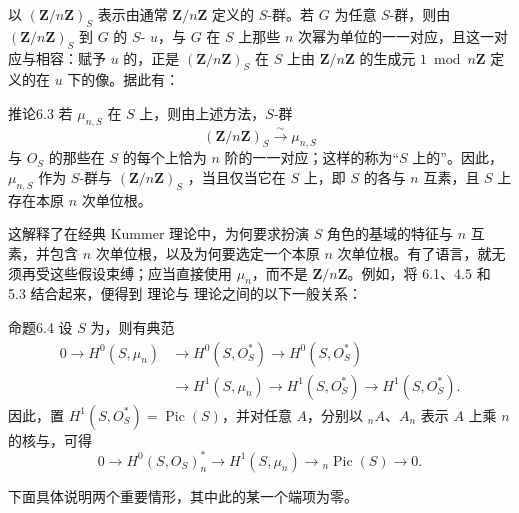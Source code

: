 以 $(\mathbf Z/n\mathbf Z)_S$ 表示由通常 $\mathbf Z/n\mathbf Z$ 定义的 $S$-群。若 $G$ 为任意 $S$-群，则由 $(\mathbf Z/n\mathbf Z)_S$ 到 $G$ 的 $S$- $u$，与 $G$ 在 $S$ 上那些 $n$ 次幂为单位的一一对应，且这一对应与相容：赋予 $u$ 的，正是 $(\mathbf Z/n\mathbf Z)_S$ 在 $S$ 上由 $\mathbf Z/n\mathbf Z$ 的生成元 $1\bmod n\mathbf Z$ 定义的在 $u$ 下的像。据此有：

\begin{SGAresult}{推论}{6.3}
若 $\mu_{n,S}$ 在 $S$ 上，则由上述方法，$S$-群
\[
(\mathbf Z/n\mathbf Z)_S\xrightarrow{\sim}\mu_{n,S}
\]
与 $O_S$ 的那些在 $S$ 的每个上恰为 $n$ 阶的一一对应；这样的称为“$S$ 上的”。因此，$\mu_{n,S}$ 作为 $S$-群与 $(\mathbf Z/n\mathbf Z)_S$ ，当且仅当它在 $S$ 上，即 $S$ 的各与 $n$ 互素，且 $S$ 上存在本原 $n$ 次单位根。
\end{SGAresult}
这解释了在经典 Kummer 理论中，为何要求扮演 $S$ 角色的基域的特征与 $n$ 互素，并包含 $n$ 次单位根，以及为何要选定一个本原 $n$ 次单位根。有了语言，就无须再受这些假设束缚；应当直接使用 $\mu_n$，而不是 $\mathbf Z/n\mathbf Z$。例如，将 6.1、4.5 和 5.3 结合起来，便得到 理论与 理论之间的以下一般关系：

\begin{SGAresult}{命题}{6.4}
设 $S$ 为，则有典范
\[
\begin{aligned}
0\longrightarrow H^0(S,\mu_n)&\longrightarrow H^0(S,O_S^*)
\longrightarrow H^0(S,O_S^*)\\
&\longrightarrow H^1(S,\mu_n)\longrightarrow H^1(S,O_S^*)
\longrightarrow H^1(S,O_S^*).
\end{aligned}
\]
因此，置 $H^1(S,O_S^*)=\operatorname{Pic}(S)$，并对任意 $A$，分别以 $ {}_nA$、$A_n$ 表示 $A$ 上乘 $n$ 的核与，可得
\[
0\longrightarrow H^0(S,O_S)^*_n
\longrightarrow H^1(S,\mu_n)\longrightarrow{}_n\operatorname{Pic}(S)
\longrightarrow0.
\]
\end{SGAresult}
下面具体说明两个重要情形，其中此的某一个端项为零。

